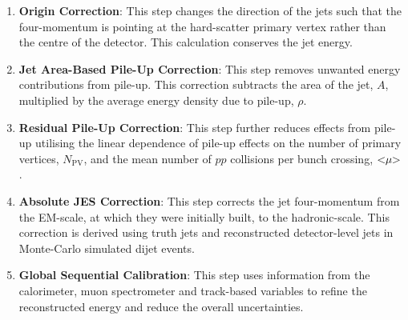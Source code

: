 \begin{enumerate}[leftmargin=*]
\item\textbf{Origin Correction}:
  This step changes the direction of the jets such that the four-momentum is pointing at the hard-scatter primary vertex
  rather than the centre of the detector.
  This calculation conserves the jet energy.\vspace{0.3em}
  \newpage
\item\textbf{Jet Area-Based Pile-Up Correction}:
  This step removes unwanted energy contributions from pile-up.
  This correction subtracts the area of the jet, $A$, multiplied by the average energy density due to pile-up, $\rho$.\vspace{0.3em}
\item\textbf{Residual Pile-Up Correction}:
  This step further reduces effects from pile-up utilising the linear dependence of pile-up effects on
  the number of primary vertices, $N_{\text{PV}}$,
  and the mean number of $pp$ collisions per bunch crossing, $<\hspace{-3pt}\mu\hspace{-3pt}>$.\vspace{0.3em}
\item\textbf{Absolute JES Correction}:
  This step corrects the jet four-momentum from the EM-scale, at which they were initially built,  to the hadronic-scale.
  This correction is derived using truth jets and reconstructed detector-level jets in Monte-Carlo simulated dijet events.\vspace{0.3em}
\item\textbf{Global Sequential Calibration}:
  This step uses information from the calorimeter, muon spectrometer and track-based variables
  to refine the reconstructed energy and reduce the overall uncertainties.\vspace{0.3em}

\end{enumerate}
